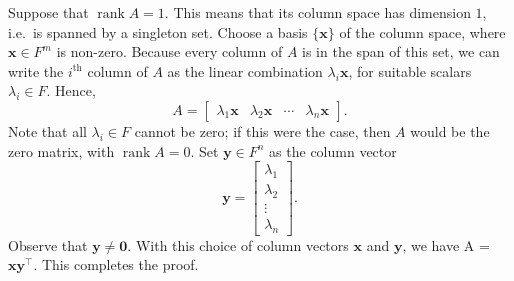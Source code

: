 \documentclass[10pt]{article}
\def\x{\bm{x}}
\def\y{\bm{y}}
\def\rank{\operatorname{rank}}
\begin{document}
        Suppose that $\rank{A} = 1$. This means that its column space has dimension $1$, i.e.\ is spanned by a singleton set.
        Choose a basis $\{\x\}$ of the column space, where $\x \in F^m$ is non-zero. Because every column of $A$ is in the span of this set,
        we can write the $i^\text{th}$ column of $A$ as the linear combination $\lambda_i\x$, for suitable scalars $\lambda_i \in F$. Hence,
        \[
                A = \begin{bmatrix}
                        \lambda_1\x & \lambda_2\x & \cdots & \lambda_n\x
                \end{bmatrix}.
        \]
        Note that all $\lambda_i \in F$ cannot be zero; if this were the case, then $A$ would be the zero matrix, with $\rank{A} = 0$.
        Set $\y \in F^n$ as the column vector
        \[
                \y = \begin{bmatrix}
                        \lambda_1 \\ \lambda_2 \\ \vdots \\ \lambda_n
                \end{bmatrix}.
        \]
        Observe that $\y \neq \mathbf{0}$.
        With this choice of column vectors $\x$ and $\y$, we have A = $\x\y^\top$.
        This completes the proof.
\end{document}
